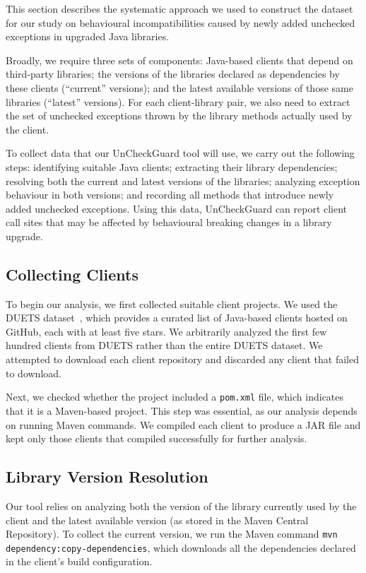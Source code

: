 This section describes the systematic approach we used to construct the dataset for our study on behavioural incompatibilities caused by newly added unchecked exceptions in upgraded Java libraries. 

Broadly, we require three sets of components: Java-based clients that depend on third-party libraries; the versions of the libraries declared as dependencies by these clients (``current'' versions); and the latest available versions of those same libraries (``latest'' versions). For each client-library pair, we also need to extract the set of unchecked exceptions thrown by the library methods actually used by the client.

To collect data that our UnCheckGuard tool will use, we carry out the following steps: identifying suitable Java clients; extracting their library dependencies; resolving both the current and latest versions of the libraries; analyzing exception behaviour in both versions; and recording all methods that introduce newly added unchecked exceptions. Using this data, UnCheckGuard can report client call sites that may be affected by behavioural breaking changes in a library upgrade.

\subsection{Collecting Clients}

To begin our analysis, we first collected suitable client projects. We used the DUETS dataset~\cite{durieux21:_duets}, which provides a curated list of Java-based clients hosted on GitHub, each with at least five stars. We arbitrarily analyzed the first few hundred clients from DUETS rather than the entire DUETS dataset. We attempted to download each client repository and discarded any client that failed to download.

Next, we checked whether the project included a \texttt{pom.xml} file, which indicates that it is a Maven-based project. This step was essential, as our analysis depends on running Maven commands. We compiled each client to produce a JAR file and kept only those clients that compiled successfully for further analysis.

\subsection{Library Version Resolution}

Our tool relies on analyzing both the version of the library currently used by the client and the latest available version (as stored in the Maven Central Repository). To collect the current version, we run the Maven command \texttt{mvn dependency:copy-dependencies}, which downloads all the dependencies declared in the client's build configuration.

